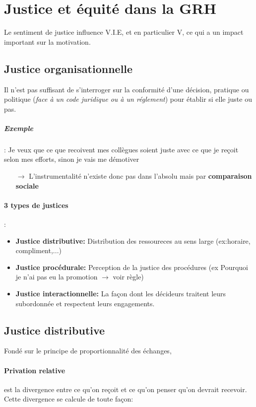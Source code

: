 \documentclass[11pt]{article} %
\begin{document}
\section{Justice et équité dans la GRH}

Le sentiment de justice influence V.I.E, et en particulier V,
ce qui a un impact important sur la motivation.

\subsection{Justice organisationnelle} 

Il n'est pas suffisant de s'interroger sur la conformité d'une
décision, pratique ou politique (\textit{face à un code juridique ou à
un réglement}) pour établir si elle juste ou pas.

\subparagraph{Exemple} : Je veux que ce que recoivent mes collègues
soient juste avec ce que je reçoit selon mes efforts, sinon je vais me
démotiver

\begin{itemize}
    \item[$\to$] L'instrumentalité n'existe donc pas dans l'absolu mais
        par \textbf{comparaison sociale}
\end{itemize}

\paragraph{3 types de justices} : 
\begin{itemize}
\item \textbf{Justice distributive:} Distribution des ressoureces au sens large
    (ex:horaire, compliment,...)
\item \textbf{Justice procédurale:} Perception de la justice des procédures (ex
    Pourquoi je n'ai pas eu la promotion $\to$ voir règle)
\item \textbf{Justice interactionnelle:} La façon dont les décideurs traitent
    leurs subordonnée et respectent leurs engagements.
\end{itemize}


\subsection{Justice distributive}

Fondé sur le principe de proportionnalité des échanges, 

\paragraph{Privation relative} est la divergence 
entre ce qu'on reçoit et ce qu'on penser qu'on devrait recevoir. Cette
divergence se calcule de toute façon:
\end{document}
